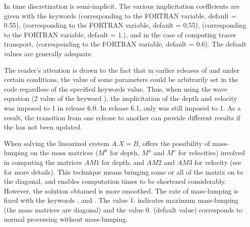 In  time discretization is semi-implicit.
The various implicitation coefficients are given with the keywords
(corresponding to the  FORTRAN variable, default = 0.55),
(corresponding to the  FORTRAN variable, default = 0.55),
(corresponding to the  FORTRAN variable, default = 1.),
and in the case of computing tracer transport,
(corresponding to the  FORTRAN variable, default = 0.6).
The default values are generally adequate.

The reader's attention is drawn to the fact that in earlier releases of
 and under certain conditions,
the value of some parameters could be arbitrarily set in the code regardless
of the specified keywords value.
Thus, when using the wave equation (2 value of the keyword
), the implicitation of the depth and
velocity was imposed to 1 in release 6.0.
In release 6.1, only  was still imposed to 1.
As a result, the transition from one release to another can provide
different results if the  has not been updated.


When solving the linearized system $A.X = B$,  offers the
possibility of mass-lumping on the mass matrices
($M^h$ for depth, $M^u$ and $M^v$ for velocities) involved in computing the
matrices $AM1$ for depth, and $AM2$ and $AM3$ for velocity
(see \cite{Hervouet2007} for more details).
This technique means bringing some or all of the matrix on to the diagonal,
and enables computation times to be shortened considerably.
However, the solution obtained is more smoothed.
The rate of mass-lumping is fixed with the keywords ,
 and
.
The value 1. indicates maximum mass-lumping (the mass matrices are diagonal)
and the value 0. (default value) corresponds to normal processing
without mass-lumping.

